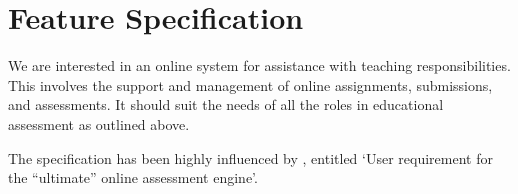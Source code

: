 
\chapter{Feature Specification}

We are interested in an online system for assistance with teaching
responsibilities. This involves the support and management of online
assignments, submissions, and assessments. It should suit the needs of all the
roles in educational assessment as outlined above.



The specification has been highly influenced by \cite{sclater-howie-2003},
entitled `User requirement for the ``ultimate'' online assessment engine'.










